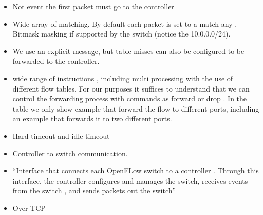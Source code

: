 \begin{itemize}
\begin{itemize}
\item Not event the first packet must go to the controller
\item Wide array of matching. By default each packet is set to a match any . Bitmask masking if supported by the switch (notice the 10.0.0.0/24). 
\item We use an explicit message, but table misses can also be configured to be forwarded to the controller. 
\item wide range of instructions , including multi processing with the use of different flow tables. For our purposes it suffices to understand that we can control the forwarding process with commands as  forward or drop . In the table we only show example that forward the flow to different ports, including an example that forwards it to two different ports. 
\item Hard timeout and idle timeout

\end{itemize}

\begin{itemize}
\item Controller to switch communication. 
\item ``Interface that connects each OpenFLow switch to a controller .  Through this interface, the controller configures and manages the switch, receives events from the switch , and sends packets out the switch'' 
\item Over TCP 


\end{itemize}
\end{itemize}
